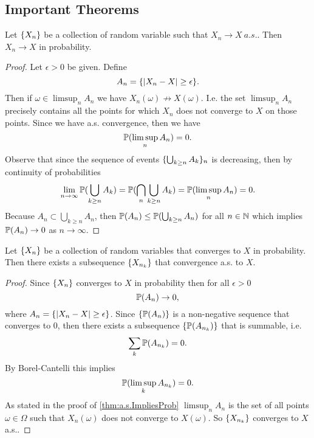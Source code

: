 \subsection{Important Theorems}
\begin{theorem}
	\label{thm:a.s.ImpliesProb}
	Let $ \{X_n\} $ be a collection of random variable such that $ X_n \to X\ a.s. $. Then $ X_n \to X $ in probability.
\end{theorem}
\begin{proof}
	Let $ \epsilon>0 $ be given. Define
	\[ A_n = \{|X_n - X| \geq \epsilon\}. \]
	Then if $ \omega \in \limsup_n A_n $ we have $ X_n(\omega) \not\to X(\omega) $. I.e. the set $ \limsup_n A_n $ precisely contains all the points for which $ X_n $ does not converge to $ X $ on those points. Since we have a.s. convergence, then we have
	\[ \mathbb{P}(\limsup_n A_n) = 0. \]
	Observe that since the sequence of events $ \{\bigcup_{k\geq n}A_k\}_n $ is decreasing, then by continuity of probabilities
	\[ \lim_{n\to\infty} \mathbb{P}(\bigcup_{k\geq n} A_k) = \mathbb{P}(\bigcap_n \bigcup_{k\geq n} A_k) = \mathbb{P}(\limsup_n A_n) = 0. \]
	Because $ A_n \subset \bigcup_{k\geq n} A_n $, then $ \mathbb{P}(A_n) \leq \mathbb{P}(\bigcup_{k\geq n} A_n) $ for all $ n\in \mathbb{N} $ which implies $ \mathbb{P}(A_n) \to 0 $ as $ n\to\infty $.
\end{proof}
\begin{theorem}
	Let $ \{X_n\} $ be a collection of random variables that converges to $ X $ in probability. Then there exists a subsequence $ \{X_{n_k}\} $ that convergence a.s. to $ X $.
\end{theorem}
\begin{proof}
	Since $ \{X_n\} $ converges to $ X $ in probability then for all $ \epsilon>0 $
	\[ \mathbb{P}(A_n) \to 0, \]
	where $ A_n = \{|X_n - X| \geq \epsilon\} $. Since $ \{\mathbb{P}(A_n)\} $ is a non-negative sequence that converges to $ 0 $, then there exists a subsequence $ \{\mathbb{P}(A_{n_k})\} $ that is summable, i.e.
	\[ \sum_k \mathbb{P}(A_{n_k}) = 0. \]
	By Borel-Cantelli this implies
	\[ \mathbb{P}(\limsup_k A_{n_k}) = 0. \]
	As stated in the proof of \autoref{thm:a.s.ImpliesProb} $ \limsup_n A_n $ is the set of all points $ \omega \in \Omega $ such that $ X_n(\omega) $ does not converge to $ X(\omega) $. So $ \{X_{n_k}\} $ converges to $ X $ a.s..
\end{proof}


